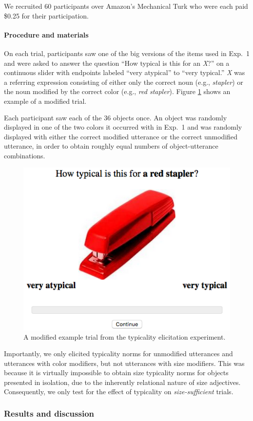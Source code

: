 \documentclass[11pt]{article}
\newcommand{\figref}[1]{Figure \ref{#1}}
\begin{document}
We recruited 60 participants over Amazon's Mechanical Turk who were each paid \$0.25 for their participation.

\paragraph{Procedure and materials}

On each trial, participants saw one of the big versions of the items used in Exp.~1 and were asked to answer the question ``How typical is this for an \emph{X}?'' on a continuous slider with endpoints labeled ``very atypical'' to ``very typical.'' \emph{X} was a referring expression consisting of either only the correct noun (e.g., \emph{stapler}) or the noun modified by the correct color (e.g., \emph{red stapler}). \figref{fig:modifiertypstimulus} shows an example of a modified trial.

Each participant saw each of the 36 objects once. An object was randomly displayed in one of the two colors it occurred with in Exp.~1 and was randomly displayed with either the correct modified utterance or the correct unmodified utterance, in order to obtain roughly equal numbers of object-utterance combinations.

\begin{figure}
\centering
\includegraphics[width=.5\textwidth]{pics/redstapler.png}
\caption{A modified example trial from the typicality elicitation experiment.}
\label{fig:modifiertypstimulus}
\end{figure}

Importantly, we only elicited typicality norms for unmodified utterances and utterances with color modifiers, but not utterances with size modifiers. This was because it is virtually impossible to obtain size typicality norms for objects presented in isolation, due to the inherently relational nature of size adjectives. Consequently, we only test for the effect of typicality on \emph{size-sufficient} trials.


\subsubsection{Results and discussion}
\end{document}

